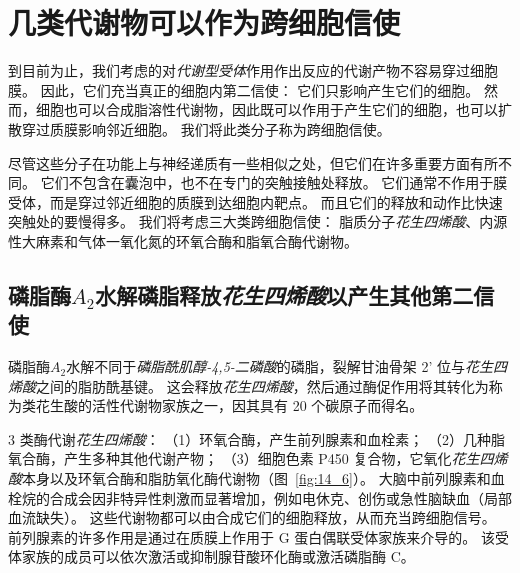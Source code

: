 \section{几类代谢物可以作为跨细胞信使}

到目前为止，我们考虑的对\textit{代谢型受体}作用作出反应的代谢产物不容易穿过细胞膜。
因此，它们充当真正的细胞内第二信使：
它们只影响产生它们的细胞。
然而，细胞也可以合成脂溶性代谢物，因此既可以作用于产生它们的细胞，也可以扩散穿过质膜影响邻近细胞。
我们将此类分子称为跨细胞信使。


尽管这些分子在功能上与神经递质有一些相似之处，但它们在许多重要方面有所不同。
它们不包含在囊泡中，也不在专门的突触接触处释放。
它们通常不作用于膜受体，而是穿过邻近细胞的质膜到达细胞内靶点。
而且它们的释放和动作比快速突触处的要慢得多。
我们将考虑三大类跨细胞信使：
脂质分子\textit{花生四烯酸}、内源性大麻素和气体一氧化氮的环氧合酶和脂氧合酶代谢物。



\subsection{磷脂酶$A_2$水解磷脂释放\textit{花生四烯酸}以产生其他第二信使}

磷脂酶$A_2$水解不同于\textit{磷脂酰肌醇-4,5-二磷酸}的磷脂，裂解甘油骨架 2' 位与\textit{花生四烯酸}之间的脂肪酰基键。
这会释放\textit{花生四烯酸}，然后通过酶促作用将其转化为称为类花生酸的活性代谢物家族之一，因其具有 20 个碳原子而得名。


3 类酶代谢\textit{花生四烯酸}：
（1）环氧合酶，产生前列腺素和血栓素；
（2）几种脂氧合酶，产生多种其他代谢产物；
（3）细胞色素 P450 复合物，它氧化\textit{花生四烯酸}本身以及环氧合酶和脂肪氧化酶代谢物（图~\ref{fig:14_6}）。
大脑中前列腺素和血栓烷的合成会因非特异性刺激而显著增加，例如电休克、创伤或急性脑缺血（局部血流缺失）。
这些代谢物都可以由合成它们的细胞释放，从而充当跨细胞信号。
前列腺素的许多作用是通过在质膜上作用于 G 蛋白偶联受体家族来介导的。
该受体家族的成员可以依次激活或抑制腺苷酸环化酶或激活磷脂酶 C。


